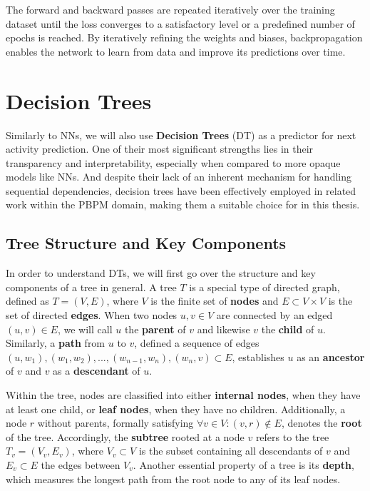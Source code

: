 The forward and backward passes are repeated iteratively over the training dataset
until the loss converges to a satisfactory level or a predefined number of epochs is reached.
By iteratively refining the weights and biases,
backpropagation enables the network to learn from data and improve its predictions over time.

\section{Decision Trees}
\label{sec:dt}
Similarly to NNs, we will also use \textbf{Decision Trees} (DT) as a predictor for next activity prediction.
One of their most significant strengths lies in their transparency and interpretability,
especially when compared to more opaque models like NNs.
And despite their lack of an inherent mechanism for handling sequential dependencies,
decision trees have been effectively employed in related work \cite{fairness_foundation} within the PBPM domain,
making them a suitable choice for in this thesis. 

\subsection{Tree Structure and Key Components}
In order to understand DTs, we will first go over the structure and key components of a tree in general.
A tree $T$ is a special type of directed graph, defined as $T=(V,E)$,
where $V$ is the finite set of \textbf{nodes} and $E \subset V \times V$ is the set of directed \textbf{edges}.
When two nodes $u,v \in V$ are connected by an edged $(u,v) \in E$,
we will call $u$ the \textbf{parent} of $v$ and likewise $v$ the \textbf{child} of $u$.
Similarly, a \textbf{path} from $u$ to $v$,
defined a sequence of edges $(u,w_1), (w_1,w_2), ..., (w_{n-1},w_n),(w_n, v) \subset E$,
establishes $u$ as an \textbf{ancestor} of $v$ and $v$ as a \textbf{descendant} of $u$.

Within the tree, nodes are classified into either \textbf{internal nodes},
when they have at least one child, or \textbf{leaf nodes},
when they have no children.
Additionally, a node $r$ without parents, formally satisfying $\forall v \in V: (v,r) \notin E$,
denotes the \textbf{root} of the tree.
Accordingly, the \textbf{subtree} rooted at a node $v$ refers to the tree $T_v = (V_v, E_v)$,
where $V_v \subset V$ is the subset containing all descendants of $v$ 
and $E_v \subset E$ the edges between $V_v$.
Another essential property of a tree is its \textbf{depth},
which measures the longest path from the root node to any of its leaf nodes.

